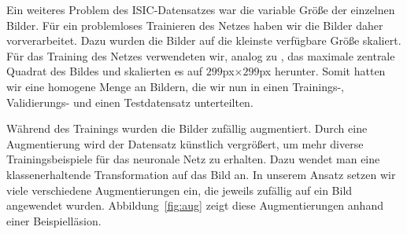 Ein weiteres Problem des ISIC-Datensatzes war die variable Größe der einzelnen Bilder. Für ein problemloses Trainieren des Netzes haben wir die Bilder daher vorverarbeitet. Dazu wurden die Bilder auf die kleinste verfügbare Größe skaliert. Für das Training des Netzes verwendeten wir, analog zu \citet{esteva2017dermatologist}, das maximale zentrale Quadrat des Bildes und skalierten es auf $299$px$\times 299$px herunter. Somit hatten wir eine homogene Menge an Bildern, die wir nun in einen Trainings-, Validierungs- und einen Testdatensatz unterteilten.

Während des Trainings wurden die Bilder zufällig augmentiert. Durch eine Augmentierung wird der Datensatz künstlich vergrößert, um mehr diverse Trainingsbeispiele für das neuronale Netz zu erhalten. Dazu wendet man eine klassenerhaltende Transformation auf das Bild an. In unserem Ansatz setzen wir viele verschiedene Augmentierungen ein, die jeweils zufällig auf ein Bild angewendet wurden. Abbildung~\ref{fig:aug} zeigt diese Augmentierungen anhand einer Beispielläsion.


